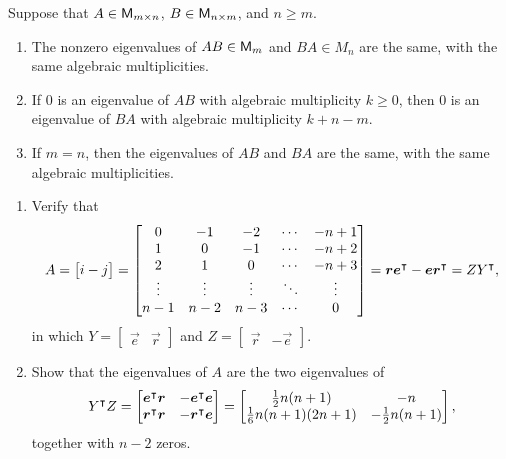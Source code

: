 \documentclass{../homework}
\begin{document}
\begin{problems}
  \begin{booktheorem}[9.7.2]
    Suppose that \(A \in \mathsf{M}_{m \times n}\), \(B \in \mathsf{M}_{n \times m}\),
    and \(n \ge m\).
    \begin{enumerate}
    \item The nonzero eigenvalues of \(AB \in \mathsf{M}_m\) and
      \(BA \in M_n\) are the same, with the same algebraic
      multiplicities.
    \item If \(0\) is an eigenvalue of \(AB\) with algebraic
      multiplicity \(k \ge 0\), then \(0\) is an eigenvalue of \(BA\)
      with algebraic multiplicity \(k+n-m\).
    \item If \(m=n\), then the eigenvalues of \(AB\) and \(BA\) are
      the same, with the same algebraic multiplicities.
    \end{enumerate}
  \end{booktheorem}

  \begin{enumerate}
  \item Verify that
    \[
      A = \begin{bmatrix} i-j \end{bmatrix} =
      \begin{bmatrix}
        0 & -1 & -2 & \cdots & -n+1 \\
        1 & 0 & -1 & \cdots & -n+2 \\
        2 & 1 & 0 & \cdots & -n+3 \\
        \vdots & \vdots & \vdots & \ddots & \vdots \\
        n-1 & n-2 & n-3 & \cdots & 0
      \end{bmatrix}
      = \vec r \vec e^\transpose - \vec e \vec r^\transpose
      = ZY^\transpose,
    \]
    in which \(Y = \begin{bmatrix} \vec e & \vec r \end{bmatrix}\) and
    \(Z = \begin{bmatrix} \vec r & -\vec e \end{bmatrix}\).

    \begin{solution}

    \end{solution}

  \item Show that the eigenvalues of \(A\) are the two eigenvalues of
    \[
      Y^\transpose Z =
      \begin{bmatrix}
        \vec e^\transpose \vec r & - \vec e^\transpose \vec e \\
        \vec r^\transpose \vec r & - \vec r^\transpose \vec e \\
      \end{bmatrix}
      =
      \begin{bmatrix}
        \frac 1 2 n(n+1) & -n \\
        \frac 1 6 n(n+1)(2n+1) & -\frac 1 2 n(n+1)
      \end{bmatrix},
    \]
    together with \(n-2\) zeros.


\end{enumerate}
\end{problems}
\end{document}

